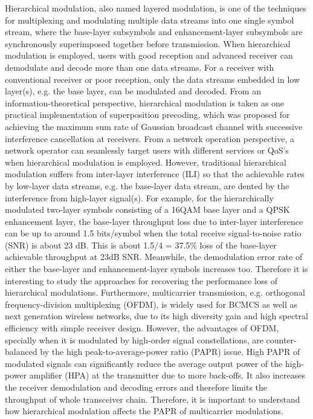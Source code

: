 \documentclass[conference]{IEEEtran}
\begin{document}
Hierarchical modulation, also named layered modulation, is one of
the techniques for multiplexing and modulating multiple data
streams into one single symbol stream, where the base-layer
subsymbols and enhancement-layer subsymbols are synchronously
superimposed together before transmission. When hierarchical
modulation is employed, users with good reception and advanced
receiver can demodulate and decode more than one data streams. For
a receiver with conventional receiver or poor reception, only the
data streams embedded in low layer(s), e.g. the base layer, can be
modulated and decoded. From an information-theoretical
perspective, hierarchical modulation is taken as one practical
implementation of superposition precoding, which was proposed for
achieving the maximum sum rate of Gaussian broadcast channel with
successive interference cancellation at receivers. From a network
operation perspective, a network operator can seamlessly target
users with different services or QoS's when hierarchical
modulation is employed. However, traditional hierarchical
modulation suffers from inter-layer interference (ILI) so that the
achievable rates by low-layer data streams, e.g. the base-layer
data stream, are dented by the interference from high-layer
signal(s). For example, for the hierarchically modulated two-layer
symbols consisting of a 16QAM base layer and a QPSK enhancement
layer, the base-layer throughput loss due to inter-layer
interference can be up to around 1.5 bits/symbol when the total
receive signal-to-noise ratio (SNR) is about 23 dB. This is about
1.5/4 = 37.5\% loss of the base-layer achievable throughput at
23dB SNR. Meanwhile, the demodulation error rate of either the
base-layer and enhancement-layer symbols increases too. Therefore
it is interesting to study the approaches for recovering the
performance loss of hierarchical modulations. Furthermore,
multicarrier transmission, e.g. orthogonal frequency-division
multiplexing (OFDM), is widely used for BCMCS as well as next
generation wireless networks, due to its high diversity gain and
high spectral efficiency with simple receiver design. However, the
advantages of OFDM, specially when it is modulated by high-order
signal constellations, are counter-balanced by the high
peak-to-average-power ratio (PAPR) issue. High PAPR of modulated
signals can significantly reduce the average output power of the
high-power amplifier (HPA) at the transmitter due to more
back-offs. It also increases the receiver demodulation and
decoding errors and therefore limits the throughput of whole
transceiver chain. Therefore, it is important to understand how
hierarchical modulation affects the PAPR of multicarrier
modulations.
\end{document}
